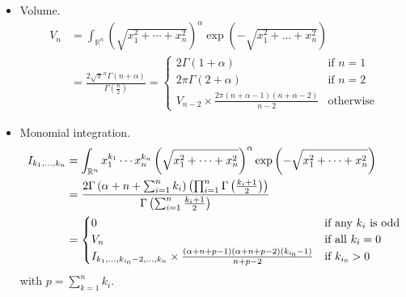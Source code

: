 \documentclass[draft]{scrartcl}
\begin{document}
\begin{itemize}
  \item Volume.
    \begin{align}\nonumber
  V_n
    &= \int_{\mathbb{R}^n} \left(\sqrt{x_1^2+\cdots+x_n^2}\right)^\alpha \exp\left(-\sqrt{x_1^2+\dots+x_n^2}\right)\\
    &= \frac{2 \sqrt{\pi}^n \Gamma(n+\alpha)}{\Gamma(\frac{n}{2})}
  = \begin{cases}
    2\Gamma(1+\alpha)&\text{if $n=1$}\\
    2\pi\Gamma(2 + \alpha)&\text{if $n=2$}\\
    V_{n-2} \times \frac{2\pi(n+\alpha-1) (n+\alpha-2)}{n-2}&\text{otherwise}
  \end{cases}
\end{align}

\item Monomial integration.
    \begin{align}\nonumber
  I_{k_1,\dots,k_n}
  &= \int_{\mathbb{R}^n} x_1^{k_1}\cdots x_n^{k_n}
    \left(\sqrt{x_1^2+\dots+x_n^2}\right)^\alpha \exp\left(-\sqrt{x_1^2+\dots+x_n^2}\right)\\
  &= \frac{%
    2 \Gamma\left(\alpha + n + \sum_{i=1}^n k_i\right)
    \left(\prod_{i=1}^n\Gamma\left(\frac{k_i + 1}{2}\right)\right)
  }{%
    \Gamma\left(\sum_{i=1}^n\frac{k_i + 1}{2}\right)
  }\\
  &=\begin{cases}
    0&\text{if any $k_i$ is odd}\\
    V_n&\text{if all $k_i=0$}\\
    I_{k_1,\dots,k_{i_0}-2,\ldots,k_n} \times \frac{%
      (\alpha + n + p - 1) (\alpha + n + p - 2) (k_{i_0} - 1)
    }{%
        n + p - 2
    }&\text{if $k_{i_0} > 0$}
  \end{cases}
\end{align}
with $p=\sum_{k=1}^n k_i$.
\end{itemize}
\end{document}
